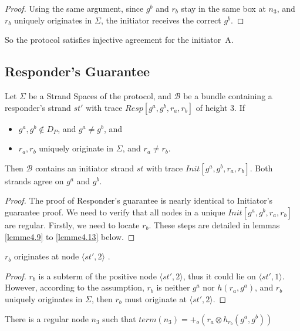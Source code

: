 \begin{itemize}
\begin{proof}
Using the same argument, since $g^b$ and $r_b$ stay in the same box at $n_3$, and $r_b$ uniquely originates in $\Sigma$, the initiator receives the correct $g^b$.
\end{proof}

So the protocol satisfies injective agreement for the initiator~A. 


\subsection{Responder's Guarantee }

\begin{Proposition}
Let $\Sigma$ be a Strand Spaces of the protocol, and $\mathcal{B}$ be a bundle containing a responder's strand $st'$ with trace $Resp[g^a,g^b,r_a,r_b]$ of height 3. If
\begin{itemize}
\item $g^a,g^b \not\in D_P$, and $g^a \not= g^b$, and
\item $r_a,r_b$ uniquely originate in $\Sigma$, and $r_a \not= r_b$.
\end{itemize}
Then $\mathcal{B}$ contains an initiator strand $st$ with trace $Init[g^a,g^b,r_a,r_b]$. Both strands agree on $g^a$ and $g^b$.
\end{Proposition}

\begin{proof}
The proof of Responder's guarantee is nearly identical to Initiator's guarantee proof. We need to verify that all nodes in a unique $Init[g^a,g^b,r_a,r_b]$ are regular. Firstly, we need to locate $r_b$. These steps are detailed in lemmas \ref{lemme4.9} to \ref{lemme4.13} below.
\end{proof}

\begin{Lemma}\label{lemme4.9}
$r_b$ originates at node $\langle st',2 \rangle$ .
\end{Lemma} 

\begin{proof}
$r_b$ is a subterm of the positive node $\langle st',2 \rangle$, thus it could lie on $\langle st',1 \rangle$. However, according to the assumption, $r_b$ is neither $g^a$ nor $h(r_a,g^a)$, and $r_b$ uniquely originates in $\Sigma$, then $r_b$ must originate at $\langle st',2 \rangle$.
\end{proof}
 
\begin{Lemma}\label{4.10}
There is a regular node $n_3$ such that $term(n_3)= +_o(r_a \otimes h_{r_b}(g^a,g^b))$ 
\end{Lemma}


\end{itemize}
